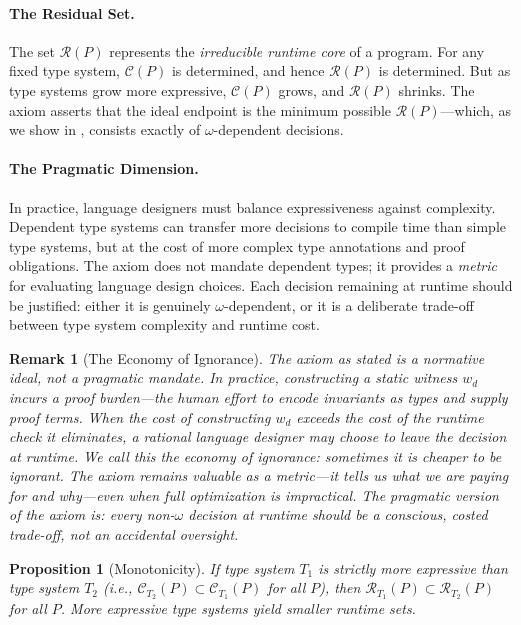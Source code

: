 \documentclass[11pt]{article}
\newtheorem{proposition}[theorem]{Proposition}
\newtheorem{remark}[theorem]{Remark}
\newcommand{\CP}{\mathcal{C}(P)}
\newcommand{\RP}{\mathcal{R}(P)}
\newcommand{\witness}{w_d}
\begin{document}
\paragraph{The Residual Set.}
The set $\RP$ represents the \emph{irreducible runtime core} of a program. For any
fixed type system, $\CP$ is determined, and hence $\RP$ is determined. But as type
systems grow more expressive, $\CP$ grows, and $\RP$ shrinks. The axiom asserts that
the ideal endpoint is the minimum possible $\RP$---which, as we show in
, consists exactly of $\omega$-dependent decisions.

\paragraph{The Pragmatic Dimension.}
In practice, language designers must balance expressiveness against complexity.
Dependent type systems can transfer more decisions to compile time than simple type
systems, but at the cost of more complex type annotations and proof obligations. The
axiom does not mandate dependent types; it provides a \emph{metric} for evaluating
language design choices. Each decision remaining at runtime should be justified: either
it is genuinely $\omega$-dependent, or it is a deliberate trade-off between type system
complexity and runtime cost.

\begin{remark}[The Economy of Ignorance]
\label{rem:economy}
The axiom as stated is a \emph{normative ideal}, not a pragmatic mandate. In practice,
constructing a static witness $\witness$ incurs a \emph{proof burden}---the human effort
to encode invariants as types and supply proof terms. When the cost of constructing
$\witness$ exceeds the cost of the runtime check it eliminates, a rational language
designer may choose to leave the decision at runtime. We call this the \emph{economy of
ignorance}: sometimes it is cheaper to be ignorant. The axiom remains valuable as a
metric---it tells us \emph{what} we are paying for and \emph{why}---even when full
optimization is impractical. The pragmatic version of the axiom is: \emph{every
non-$\omega$ decision at runtime should be a conscious, costed trade-off, not an
accidental oversight}.
\end{remark}

\begin{proposition}[Monotonicity]
\label{prop:monotone}
If type system $T_1$ is strictly more expressive than type system $T_2$ (i.e.,
$\mathcal{C}_{T_2}(P) \subset \mathcal{C}_{T_1}(P)$ for all $P$), then
$\mathcal{R}_{T_1}(P) \subset \mathcal{R}_{T_2}(P)$ for all $P$. More expressive
type systems yield smaller runtime sets.
\end{proposition}
\end{document}
